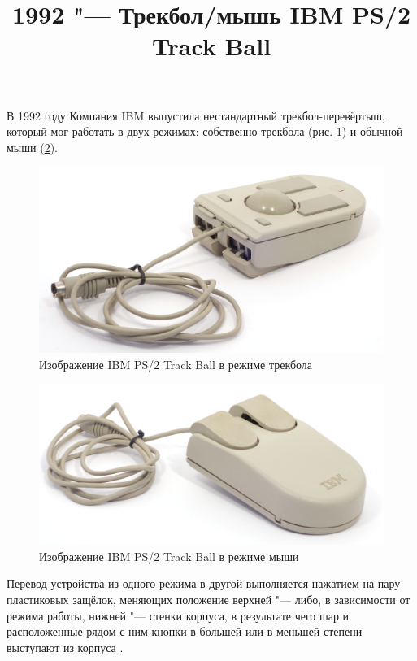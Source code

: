 \documentclass[11pt, a4paper]{article}
\begin{document}
\title{1992 "--- Трекбол/мышь IBM PS/2 Track Ball}
\date{}
\maketitle
{}
В 1992 году Компания IBM выпустила нестандартный трекбол-перевёртыш, который мог работать в двух режимах: собственно трекбола (рис. \ref{fig:IBMConvertibleTrackball}) и обычной мыши (\ref{fig:IBMConvertibleMouse}).

\begin{figure}[h]
    \centering
    \includegraphics[scale=0.5]{1992_ibm_convertible/picball_60}
    \caption{Изображение IBM PS/2 Track Ball в режиме трекбола}
    \label{fig:IBMConvertibleTrackball}
\end{figure}

\begin{figure}[h]
    \centering
    \includegraphics[scale=0.5]{1992_ibm_convertible/picmouse_60}
    \caption{Изображение IBM PS/2 Track Ball в режиме мыши}
    \label{fig:IBMConvertibleMouse}
\end{figure}

Перевод устройства из одного режима в другой выполняется нажатием на пару пластиковых защёлок, меняющих положение верхней "--- либо, в зависимости от режима работы, нижней "--- стенки корпуса, в результате чего шар и расположенные рядом с ним кнопки в большей или в меньшей степени выступают из корпуса \cite{mouses}.
\end{document}
